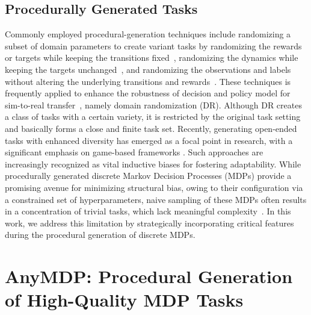 \documentclass{article}
\begin{document}
\subsection{Procedurally Generated Tasks}
Commonly employed procedural-generation techniques include randomizing a subset of domain parameters to create variant tasks by randomizing the rewards or targets while keeping the transitions fixed~\citep{laskin2022context, lee2024supervised, mishra2018simple, finn2017model, yu2020meta, alegre2022mo}, randomizing the dynamics while keeping the targets unchanged~\citep{najarro2020meta,wang2022evolving,cobbe2020leveraging, pedersen2021evolving, akyurek2024context, nikulin2023xland}, and randomizing the observations and labels without altering the underlying transitions and rewards~\citep{kirsch2022general,morad2023popgym,sinii2024context}.
These techniques is frequently applied to enhance the robustness of decision and policy model for sim-to-real transfer~\citep{peng2018sim, team2022learning, akkaya2019solving}, namely domain randomization (DR).
Although DR creates a class of tasks with a certain variety, it is restricted by the original task setting and basically forms a close and finite task set.
Recently, generating open-ended tasks with enhanced diversity has emerged as a focal point in research, with a significant emphasis on game-based frameworks \citep{team2021open, team2022learning, wang2024benchmarking, nikulin2024xland, team2021open, team2022learning, bauer2023human}. Such approaches are increasingly recognized as vital inductive biases for fostering adaptability. While procedurally generated discrete Markov Decision Processes (MDPs) provide a promising avenue for minimizing structural bias, owing to their configuration via a constrained set of hyperparameters, naive sampling of these MDPs often results in a concentration of trivial tasks, which lack meaningful complexity~\citep{archibald1995generation, bhatnagar2009natural}. In this work, we address this limitation by strategically incorporating critical features during the procedural generation of discrete MDPs.


\section{AnyMDP: Procedural Generation of High-Quality MDP Tasks}\label{sec:anymdp}
\end{document}
